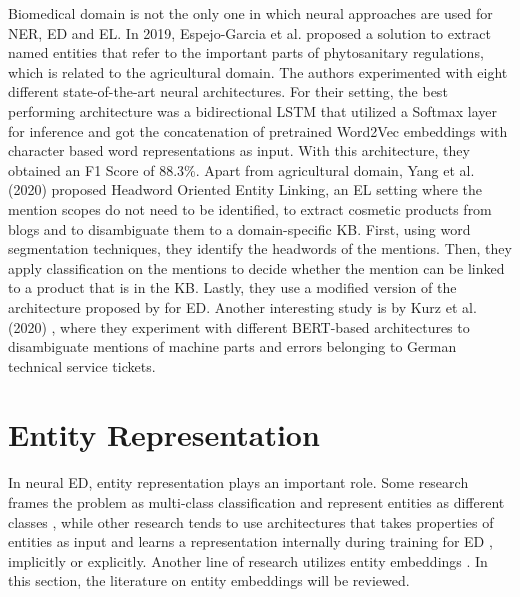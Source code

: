 \documentclass{report}
\theoremstyle{definition}
\theoremstyle{remark}
\begin{document}
Biomedical domain is not the only one in which neural approaches are used for NER, ED and EL. In 2019, Espejo-Garcia et al. \cite{agricultural} proposed a solution to extract named entities that refer to the important parts of phytosanitary regulations, which is related to the agricultural domain. The authors experimented with eight different state-of-the-art neural architectures. For their setting, the best performing architecture was a bidirectional LSTM \cite{bilstm} that utilized a Softmax layer for inference and got the concatenation of pretrained Word2Vec \cite{w2v} embeddings with character based word representations as input. With this architecture, they obtained an F1 Score of 88.3\%. Apart from agricultural domain, Yang et al. (2020) \cite{cosmetic} proposed Headword Oriented Entity Linking, an EL setting where the mention scopes do not need to be identified, to extract cosmetic products from blogs and to disambiguate them to a domain-specific KB. First, using word segmentation techniques, they identify the headwords of the mentions. Then, they apply classification on the mentions to decide whether the mention can be linked to a product that is in the KB. Lastly, they use a modified version of the architecture proposed by \cite{gupta} for ED.  Another interesting study is by Kurz et al. (2020) \cite{TechTickets}, where they experiment with different BERT-based architectures to disambiguate mentions of machine parts and errors belonging to German technical service tickets.

\section{Entity Representation}
\label{entityRep}

In neural ED, entity representation plays an important role. Some research frames the problem as multi-class classification and represent entities as different classes \cite{bertEL,MedDiffArc,MedFeedback}, while other research tends to use architectures that takes properties of entities as input and learns a representation internally during training for ED \cite{scalablezeroshot}, implicitly or explicitly. Another line of research utilizes entity embeddings \cite{REL,kolitsas,dca,MedicalTriplet}. In this section, the literature on entity embeddings will be reviewed.
\end{document}
